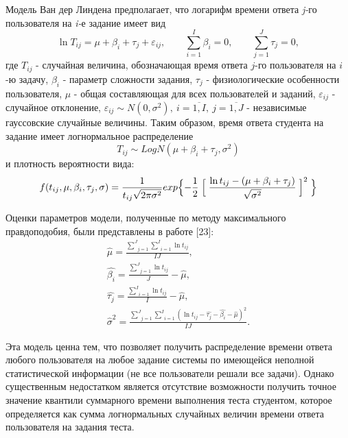 \documentclass[14pt, a4paper]{extarticle}
\numberwithin{equation}{section}
\begin{document}
{Модель Ван дер Линдена предполагает, что логарифм времени ответа \emph{j-}го пользователя на \emph{i-}е задание имеет вид
\begin{equation}
\ln T_{ij}=\mu+\beta_i+\tau_j+\varepsilon_{ij}, \qquad \underset{i=1}{\overset{I}{\sum}}\beta_i=0 , \qquad \underset{j=1}{\overset{J}{\sum}} \tau_j=0,
\end{equation}
где $T_{ij}$ - случайная величина, обозначающая время ответа $j$-го пользователя на $i$-ю задачу, $\beta_i$ - параметр сложности задания, $\tau_j$ - физиологические особенности пользователя, $\mu$ - общая составляющая для всех пользователей и заданий, $\varepsilon_{ij}$ - случайное отклонение, $\varepsilon_{ij} \sim N(0,\sigma^2), \: i=\overline{1,I}, \:  j=\overline{1,J}$ - независимые гауссовские случайные величины.
Таким образом, время ответа студента на задание имеет логнормальное распределение
\begin{equation}
T_{ij} \sim LogN(\mu+\beta_i+\tau_j,\sigma^2)
\end{equation}
и плотность вероятности вида:
\begin{equation}
f(t_{ij},\mu,\beta_i,\tau_j,\sigma)=\frac{1}{t_{ij} \sqrt{2\pi\sigma^2}} exp \Bigl\{ -\frac{1}{2} \Bigm[\frac{\ln t_{ij}-(\mu+\beta_i+\tau_j)}{\sqrt{\sigma^2}} \Bigm]^2\Bigl\}
\end{equation}

Оценки параметров модели, полученные по методу максимального правдоподобия, были представлены в работе [23]:
\begin{gather}
\hat{\mu}=\frac{ \underset{j=1}{\overset{J}{\sum}} \underset{i=1}{\overset{I}{\sum}} \ln t_{ij}}{IJ}, \\ \hat{\beta_i}=\frac{\underset{j=1}{\overset{J}{\sum}} \ln t_{ij}}{J} - \hat{\mu}, \\
\hat{\tau_j}=\frac{\underset{i=1}{\overset{I}{\sum}} \ln t_{ij}}{I} - \hat{\mu}, \\
\hat{\sigma}^2=\frac{\underset{j=1}{\overset{J}{\sum}} \underset{i=1}{\overset{I}{\sum}} (\ln t_{ij} - \hat{\tau_j} - \hat{\beta_i} - \hat{\mu})^2}{IJ}.
\end{gather}

Эта модель ценна тем, что позволяет получить распределение времени ответа любого пользователя на любое задание системы по имеющейся неполной статистической информации (не все пользователи решали все задачи). Однако существенным недостатком является отсутствие возможности  получить точное значение квантили суммарного времени выполнения теста студентом, которое определяется как сумма логнормальных случайных величин времени ответа пользователя на задания теста.

}
\end{document}
